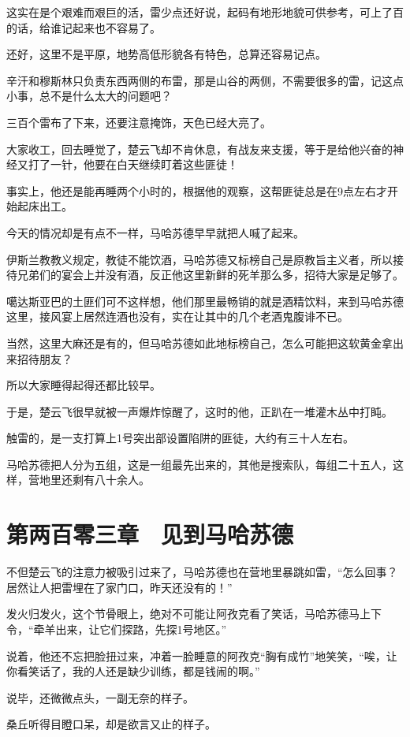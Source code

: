 这实在是个艰难而艰巨的活，雷少点还好说，起码有地形地貌可供参考，可上了百的话，给谁记起来也不容易了。

还好，这里不是平原，地势高低形貌各有特色，总算还容易记点。

辛汗和穆斯林只负责东西两侧的布雷，那是山谷的两侧，不需要很多的雷，记这点小事，总不是什么太大的问题吧？

三百个雷布了下来，还要注意掩饰，天色已经大亮了。

大家收工，回去睡觉了，楚云飞却不肯休息，有战友来支援，等于是给他兴奋的神经又打了一针，他要在白天继续盯着这些匪徒！

事实上，他还是能再睡两个小时的，根据他的观察，这帮匪徒总是在9点左右才开始起床出工。

今天的情况却是有点不一样，马哈苏德早早就把人喊了起来。

伊斯兰教教义规定，教徒不能饮酒，马哈苏德又标榜自己是原教旨主义者，所以接待兄弟们的宴会上并没有酒，反正他这里新鲜的死羊那么多，招待大家是足够了。

噶达斯亚巴的土匪们可不这样想，他们那里最畅销的就是酒精饮料，来到马哈苏德这里，接风宴上居然连酒也没有，实在让其中的几个老酒鬼腹诽不已。

当然，这里大麻还是有的，但马哈苏德如此地标榜自己，怎么可能把这软黄金拿出来招待朋友？

所以大家睡得起得还都比较早。

于是，楚云飞很早就被一声爆炸惊醒了，这时的他，正趴在一堆灌木丛中打盹。

触雷的，是一支打算上1号突出部设置陷阱的匪徒，大约有三十人左右。

马哈苏德把人分为五组，这是一组最先出来的，其他是搜索队，每组二十五人，这样，营地里还剩有八十余人。

\section{第两百零三章　见到马哈苏德}

不但楚云飞的注意力被吸引过来了，马哈苏德也在营地里暴跳如雷，“怎么回事？居然让人把雷埋在了家门口，昨天还没有的！”

发火归发火，这个节骨眼上，绝对不可能让阿孜克看了笑话，马哈苏德马上下令，“牵羊出来，让它们探路，先探1号地区。”

说着，他还不忘把脸扭过来，冲着一脸睡意的阿孜克“胸有成竹”地笑笑，“唉，让你看笑话了，我的人还是缺少训练，都是钱闹的啊。”

说毕，还微微点头，一副无奈的样子。

桑丘听得目瞪口呆，却是欲言又止的样子。

